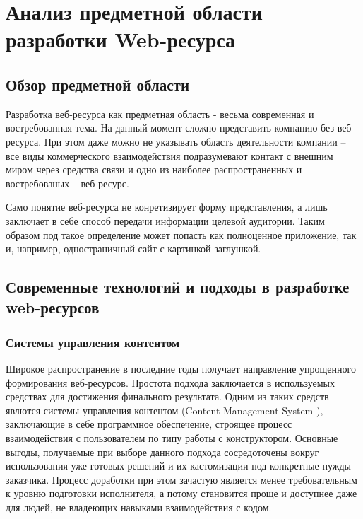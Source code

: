 \section{Анализ предметной области разработки Web-ресурса}
\subsection{Обзор предметной области}
    Разработка веб-ресурса как предметная область - весьма современная и востребованная тема.
    На данный момент сложно представить компанию без веб-ресурса.
    При этом даже можно не указывать область деятельности компании -- все виды коммерческого взаимодействия подразумевают контакт с внешним миром через средства связи и одно из наиболее распространенных и востребованых -- веб-ресурс.
    
    Само понятие веб-ресурса не конретизирует форму представления, а лишь заключает в себе способ передачи информации целевой аудитории.
    Таким образом под такое определение может попасть как полноценное приложение, так и, например, одностраничный сайт с картинкой-заглушкой.


\subsection{Современные технологий и подходы в разработке web-ресурсов}
    \subsubsection{Системы управления контентом}
        Широкое распространение в последние годы получает направление упрощенного формирования веб-ресурсов.
        Простота подхода заключается в используемых средствах для достижения финального результата.
        Одним из таких средств явлются системы управления контентом (Content Management System \cite{wiki-CMS}), заключающие в себе программное обеспечение, строящее процесс взаимодействия с пользователем по типу работы с конструктором.
        Основные выгоды, получаемые при выборе данного подхода сосредоточены вокруг использования уже готовых решений и их кастомизации под конкретные нужды заказчика.
        Процесс доработки при этом зачастую является менее требовательным к уровню подготовки исполнителя, а потому становится проще и доступнее даже для людей, не владеющих навыками взаимодействия с кодом.

